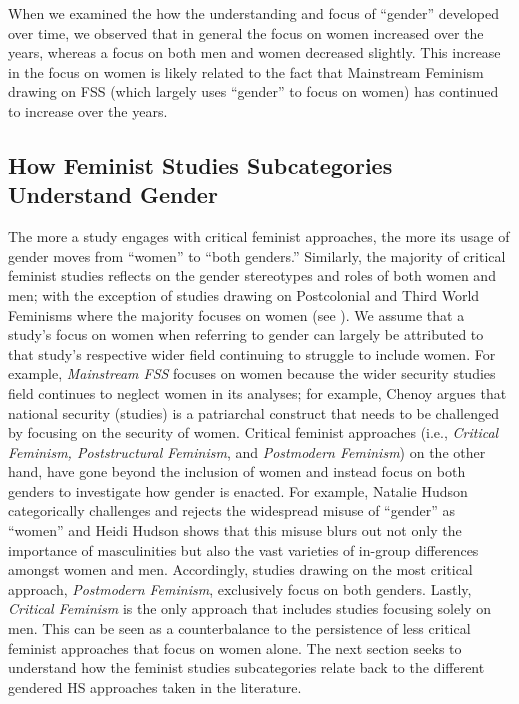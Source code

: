 \documentclass[10pt,a4paper]{article}
\begin{document}
\begin{multicols}{2}
When we examined the how the understanding and focus of ``gender'' developed over time, we observed that in general the focus on women increased over the years, whereas a focus on both men and women decreased slightly. This increase in the focus on women is likely related to the fact that Mainstream Feminism drawing on FSS (which largely uses ``gender'' to focus on women) has continued to increase over the years.

\subsection{How Feminist Studies Subcategories Understand Gender}

\noindent The more a study engages with critical feminist approaches, the more its usage of gender moves from ``women'' to ``both genders.'' Similarly, the majority of critical feminist studies reflects on the gender stereotypes and roles of both women and men; with the exception of studies drawing on Postcolonial and Third World Feminisms where the majority focuses on women (see \citep{R33}). We assume that a study's focus on women when referring to gender can largely be attributed to that study's respective wider field continuing to struggle to include women. For example, \textit{Mainstream FSS} focuses on women because the wider security studies field continues to neglect women in its analyses; for example, Chenoy \citep{R34} argues that national security (studies) is a patriarchal construct that needs to be challenged by focusing on the security of women. Critical feminist approaches (i.e., \textit{Critical Feminism, Poststructural Feminism}, and \textit{Postmodern Feminism}) on the other hand, have gone beyond the inclusion of women and instead focus on both genders to investigate how gender is enacted. For example, Natalie Hudson \citep{R21} categorically challenges and rejects the widespread misuse of ``gender'' as ``women'' and Heidi Hudson \citep{R22} shows that this misuse blurs out not only the importance of masculinities but also the vast varieties of in-group differences amongst women and men. Accordingly, studies drawing on the most critical approach, \textit{Postmodern Feminism}, exclusively focus on both genders. Lastly, \textit{Critical Feminism} is the only approach that includes studies focusing solely on men. This can be seen as a counterbalance to the persistence of less critical feminist approaches that focus on women alone. The next section seeks to understand how the feminist studies subcategories relate back to the different gendered HS approaches taken in the literature.


\end{multicols}
\end{document}
